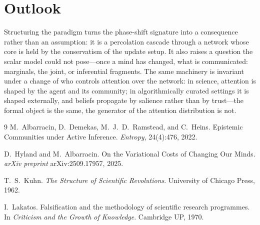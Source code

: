 \documentclass[11pt,a4paper]{article}
\begin{document}
\section*{Outlook}

Structuring the paradigm turns the phase-shift signature into a consequence
rather than an assumption: it is a percolation cascade through a network whose
core is held by the conservatism of the update setup. It also raises a question
the scalar model could not pose---once a mind has changed, what is communicated:
marginals, the joint, or inferential fragments. The same machinery is invariant
under a change of who controls attention over the network: in science, attention
is shaped by the agent and its community; in algorithmically curated settings it
is shaped externally, and beliefs propagate by salience rather than by
trust---the formal object is the same, the generator of the attention
distribution is not.

\begin{thebibliography}{9}
M.~Albarracin, D.~Demekas, M.~J.~D.~Ramstead, and C.~Heins.
\newblock Epistemic Communities under Active Inference.
\newblock \emph{Entropy}, 24(4):476, 2022.

D.~Hyland and M.~Albarracin.
\newblock On the Variational Costs of Changing Our Minds.
\newblock \emph{arXiv preprint} arXiv:2509.17957, 2025.

T.~S.~Kuhn.
\newblock \emph{The Structure of Scientific Revolutions}.
\newblock University of Chicago Press, 1962.

I.~Lakatos.
\newblock Falsification and the methodology of scientific research programmes.
\newblock In \emph{Criticism and the Growth of Knowledge}. Cambridge UP, 1970.
\end{thebibliography}
\end{document}
